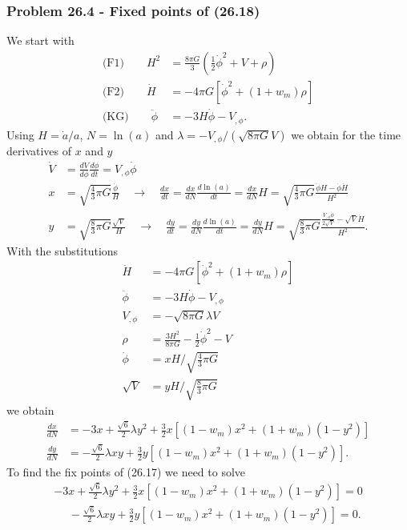 \documentclass[10pt,a4paper]{book}
\theoremstyle{definition}
\begin{document}
\subsubsection{Problem 26.4 - Fixed points of (26.18)}
We start with
\begin{align}
    \text{(F1)}\qquad H^2&=\frac{8\pi G}{3}\left(\frac{1}{2}\dot{\phi}^2+V+\rho\right)\\
    \text{(F2)}\qquad \dot{H}&=-4\pi G\left[\dot{\phi}^2+(1+w_m)\rho\right]\\
    \text{(KG)}\qquad \ddot{\phi}&=-3H\dot{\phi}-V_{,\phi}.
\end{align}
Using $H=\dot{a}/a$, $N=\ln(a)$ and $\lambda=-V_{,\phi}/(\sqrt{8\pi G}V)$ we obtain for the time derivatives of $x$ and $y$
\begin{align}
    \dot{V}&=\frac{dV}{d\phi}\frac{d\phi}{dt}=V_{,\phi}\dot{\phi}\\
    x&=\sqrt{\frac{4}{3}\pi G}\frac{\dot{\phi}}{H}\quad\rightarrow\quad\frac{dx}{dt}=\frac{dx}{dN}\frac{d\ln(a)}{dt}
    =\frac{dx}{dN}H
    =\sqrt{\frac{4}{3}\pi G}\frac{\ddot{\phi}H-\dot{\phi}\dot{H}}{H^2}\\
    y&=\sqrt{\frac{8}{3}\pi G}\frac{\sqrt{V}}{H}\quad\rightarrow\quad\frac{dy}{dt}=\frac{dy}{dN}\frac{d\ln(a)}{dt}
    =\frac{dy}{dN}H
    =\sqrt{\frac{8}{3}\pi G}\frac{\frac{V_{,\phi}\dot{\phi}}{2\sqrt{V}}-\sqrt{V}\dot{H}}{H^2}.
\end{align}
With the substitutions
\begin{align}
    \dot{H}&=-4\pi G\left[\dot{\phi}^2+(1+w_m)\rho\right]\\
    \ddot{\phi}&=-3H\dot{\phi}-V_{,\phi}\\
    V_{,\phi}&=-\sqrt{8\pi G}\lambda V\\
    \rho&=\frac{3H^2}{8\pi G}-\frac{1}{2}\dot{\phi}^2-V\\
    \dot{\phi}&=xH/\sqrt{\frac{4}{3}\pi G}\\
    \sqrt{V}&=yH/\sqrt{\frac{8}{3}\pi G}
\end{align}
we obtain
\begin{align}
    \frac{dx}{dN}
    &=-3x+\frac{\sqrt{6}}{2}\lambda y^2+\frac{3}{2}x[(1-w_m)x^2+(1+w_m)(1-y^2)]\\
    \frac{dy}{dN}
    &=-\frac{\sqrt{6}}{2}\lambda xy+\frac{3}{2}y[(1-w_m)x^2+(1+w_m)(1-y^2)].
\end{align}
To find the fix points of (26.17) we need to solve
\begin{align}
    -3x+\frac{\sqrt{6}}{2}\lambda y^2+\frac{3}{2}x[(1-w_m)x^2+(1+w_m)(1-y^2)]=0\\
    \quad\,\,-\frac{\sqrt{6}}{2}\lambda xy+\frac{3}{2}y[(1-w_m)x^2+(1+w_m)(1-y^2)]=0.
\end{align}
\end{document}
